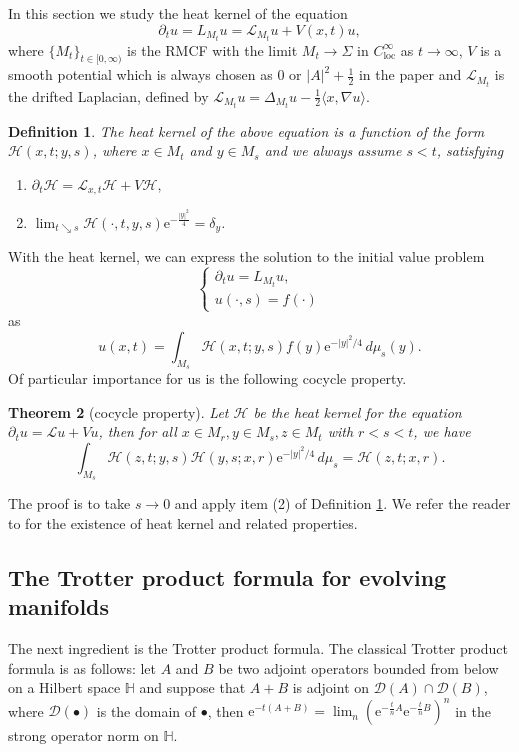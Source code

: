 \documentclass[12pt]{amsart}
\numberwithin{equation}{section}
\newtheorem{theorem}{Theorem}[section]
\newtheorem{definition}[theorem]{Definition}
\numberwithin{equation}{section}
\newcommand{\cH}{\mathcal{H}}
\newcommand{\cL}{\mathcal{L}}
\DeclareMathOperator{\loc}{loc}
\begin{document}
	In this section we study the heat kernel of the equation
	$$\partial_tu=L_{M_t}u=\mathcal L_{M_t} u+V(x,t)u,$$
	where $\{M_t\}_{t\in[0,\infty)}$ is the RMCF with the limit $M_t\to \Sigma$ in $C_{\loc}^\infty$ as $t\to \infty$, $V$ is a smooth potential which is always chosen as 0 or $|A|^2+\frac12 $ in the paper and $\cL_{M_t}$ is the drifted Laplacian, defined by $\cL_{M_t}u=\Delta_{M_t}u-\frac{1}{2}\langle x,\nabla u\rangle$.
	\begin{definition}\label{DefHeatKernel}
		The heat kernel of the above equation is a function of the form $\cH(x,t; y,s)$, where $x\in M_t$ and $y\in M_s$ and we always assume $s<t$, satisfying
		\begin{enumerate}
			\item $\partial_t \cH=\cL_{x,t} \cH+V\cH,$
			\item $\lim_{t\searrow s}\cH(\cdot ,t,y,s)\mathrm{e}^{-\frac{|y|^2}{4}}=\delta_y$.
		\end{enumerate}
	\end{definition}
	With the heat kernel, we can express the solution to the initial value problem \begin{equation}\label{EqCauchy}\begin{cases}\partial_t u=L_{M_t} u,\\
			u(\cdot, s)=f(\cdot)\end{cases}\end{equation} as \begin{equation}\label{EqReproducing}u(x,t)=\int_{M_s} \cH(x,t;y,s) f(y)\mathrm{e}^{-|y|^2/4}\,d\mu_s(y).\end{equation}
	Of particular importance for us is the following cocycle property. 
	\begin{theorem}[cocycle property]
		Let $\cH$ be the heat kernel for the equation  $\partial_t u=\cL u+Vu$, then for all $x\in M_r, y\in M_s, z\in M_t$ with $ r<s<t$, we have
		\begin{equation}\label{EqCocycle}\int_{M_s} \cH(z,t;y,s) \cH(y,s;x,r)\mathrm{e}^{-|y|^2/4}\,d\mu_s=\cH(z,t;x,r). \end{equation}
	\end{theorem}
	The proof is to take $s\to 0$ and apply item (2) of Definition \ref{DefHeatKernel}. We refer the reader to \cite[Chapter 26]{CC} for the existence of heat kernel and related properties.
	\subsection{The Trotter product formula for evolving manifolds}
	The next ingredient is the Trotter product formula. The classical Trotter product formula is as follows: let $A$ and $B$ be two adjoint operators bounded from below on a Hilbert space $\mathbb H$ and suppose that $A+B$ is adjoint on $\mathcal D(A)\cap \mathcal D(B)$, where $\mathcal D(\bullet)$ is the domain of $\bullet$, then $\mathrm{e}^{-t(A+B)}=\lim_{n} (\mathrm{e}^{-\frac{t}{n}A}\mathrm{e}^{-\frac{t}{n}B})^n$ in the strong operator norm on $\mathbb H$. 
	
\end{document}
